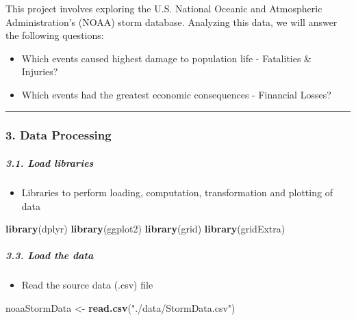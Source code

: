 \documentclass[]{article}
\newenvironment{Shaded}{\begin{snugshade}}{\end{snugshade}}
\newcommand{\KeywordTok}[1]{\textcolor[rgb]{0.13,0.29,0.53}{\textbf{{#1}}}}
\newcommand{\StringTok}[1]{\textcolor[rgb]{0.31,0.60,0.02}{{#1}}}
\newcommand{\NormalTok}[1]{{#1}}
\providecommand{\tightlist}{%
  \setlength{\itemsep}{0pt}\setlength{\parskip}{0pt}}
\let\oldsubparagraph\subparagraph
\renewcommand{\subparagraph}[1]{\oldsubparagraph{#1}\mbox{}}
\begin{document}
This project involves exploring the U.S. National Oceanic and
Atmospheric Administration's (NOAA) storm database. Analyzing this data,
we will answer the following questions:

\begin{itemize}
\tightlist
\item
  Which events caused highest damage to population life - Fatalities \&
  Injuries?
\item
  Which events had the greatest economic consequences - Financial
  Losses?
\end{itemize}

\begin{center}\rule{0.5\linewidth}{\linethickness}\end{center}

\subsubsection{3. Data Processing}\label{data-processing}

\subparagraph{3.1. Load libraries}\label{load-libraries}

\begin{itemize}
\tightlist
\item
  Libraries to perform loading, computation, transformation and plotting
  of data
\end{itemize}

\begin{Shaded}
\begin{Highlighting}[]
\KeywordTok{library}\NormalTok{(dplyr)}
\KeywordTok{library}\NormalTok{(ggplot2)}
\KeywordTok{library}\NormalTok{(grid)}
\KeywordTok{library}\NormalTok{(gridExtra)}
\end{Highlighting}
\end{Shaded}

\subparagraph{3.3. Load the data}\label{load-the-data}

\begin{itemize}
\tightlist
\item
  Read the source data (.csv) file
\end{itemize}

\begin{Shaded}
\begin{Highlighting}[]
  \NormalTok{noaaStormData <-}\StringTok{ }\KeywordTok{read.csv}\NormalTok{(}\StringTok{"./data/StormData.csv"}\NormalTok{)}
\end{Highlighting}
\end{Shaded}
\end{document}
